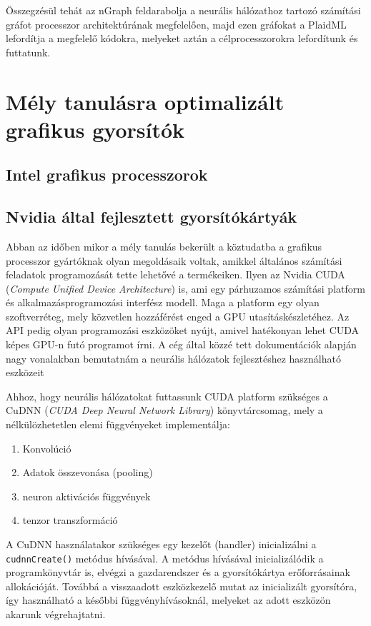 Összegzésül tehát az nGraph feldarabolja a neurális hálózathoz tartozó számítási gráfot processzor architektúrának megfelelően, majd ezen gráfokat a PlaidML lefordítja a megfelelő kódokra, melyeket aztán a célprocesszorokra lefordítunk és futtatunk.

\section{Mély tanulásra optimalizált grafikus gyorsítók}
\subsection{Intel grafikus processzorok}

\subsection{Nvidia által fejlesztett gyorsítókártyák}
Abban az időben mikor a mély tanulás bekerült a köztudatba a grafikus processzor gyártóknak olyan megoldásaik voltak, amikkel általános számítási feladatok programozását tette lehetővé a termékeiken. Ilyen az Nvidia CUDA (\emph{Compute Unified Device Architecture}) is, ami egy párhuzamos számítási platform és alkalmazásprogramozási interfész modell. Maga a platform egy olyan szoftverréteg, mely közvetlen hozzáférést enged a GPU utasításkészletéhez.\cite{wiki:cuda} Az API pedig olyan programozási eszközöket nyújt, amivel hatékonyan lehet CUDA képes GPU-n futó programot írni. A cég által közzé tett dokumentációk alapján nagy vonalakban bemutatnám a neurális hálózatok fejlesztéshez használható eszközeit\cite{web:cudnn}

Ahhoz, hogy neurális hálózatokat futtassunk CUDA platform szükséges a CuDNN (\emph{CUDA Deep Neural Network Library}) könyvtárcsomag, mely a nélkülözhetetlen elemi függvényeket implementálja:
\begin{enumerate}
	\item Konvolúció
	\item Adatok összevonása (pooling)
	\item neuron aktivációs függvények
	\item tenzor transzformáció
\end{enumerate}
A CuDNN használatakor szükséges egy kezelőt (handler) inicializálni a \verb|cudnnCreate()| metódus hívásával. A metódus hívásával inicializálódik a programkönyvtár is, elvégzi a gazdarendszer és a gyorsítókártya erőforrásainak allokációját. Továbbá a visszaadott eszközkezelő mutat az inicializált gyorsítóra, így használható a későbbi függvényhívásoknál, melyeket az adott eszközön akarunk végrehajtatni.

